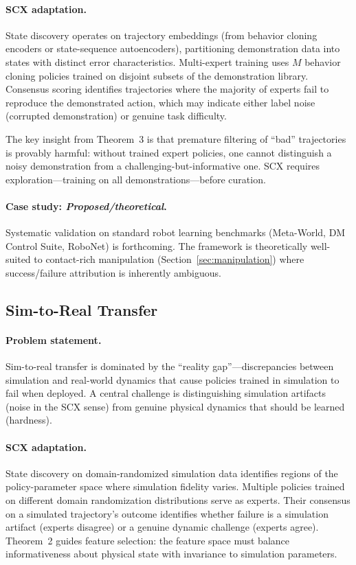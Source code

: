 \documentclass[twocolumn]{article}
\theoremstyle{definition}
\begin{document}
\paragraph{SCX adaptation.}
State discovery operates on trajectory embeddings (from behavior cloning encoders or state-sequence autoencoders), partitioning demonstration data into states with distinct error characteristics. Multi-expert training uses $M$ behavior cloning policies trained on disjoint subsets of the demonstration library. Consensus scoring identifies trajectories where the majority of experts fail to reproduce the demonstrated action, which may indicate either label noise (corrupted demonstration) or genuine task difficulty.

The key insight from Theorem~3 is that premature filtering of ``bad'' trajectories is provably harmful: without trained expert policies, one cannot distinguish a noisy demonstration from a challenging-but-informative one. SCX requires exploration---training on all demonstrations---before curation.

\paragraph{Case study: \emph{Proposed/theoretical}.}
Systematic validation on standard robot learning benchmarks (Meta-World, DM Control Suite, RoboNet) is forthcoming. The framework is theoretically well-suited to contact-rich manipulation (Section~\ref{sec:manipulation}) where success/failure attribution is inherently ambiguous.

\subsection{Sim-to-Real Transfer}

\paragraph{Problem statement.}
Sim-to-real transfer is dominated by the ``reality gap''---discrepancies between simulation and real-world dynamics that cause policies trained in simulation to fail when deployed. A central challenge is distinguishing simulation artifacts (noise in the SCX sense) from genuine physical dynamics that should be learned (hardness).

\paragraph{SCX adaptation.}
State discovery on domain-randomized simulation data identifies regions of the policy-parameter space where simulation fidelity varies. Multiple policies trained on different domain randomization distributions serve as experts. Their consensus on a simulated trajectory's outcome identifies whether failure is a simulation artifact (experts disagree) or a genuine dynamic challenge (experts agree). Theorem~2 guides feature selection: the feature space must balance informativeness about physical state with invariance to simulation parameters.
\end{document}

